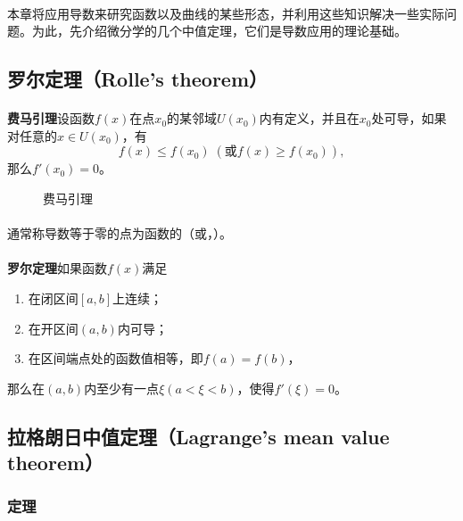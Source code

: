 \paragraph{}
本章将应用导数来研究函数以及曲线的某些形态，并利用这些知识解决一些实际问题。为此，先介绍微分学的几个中值定理，它们是导数应用的理论基础。

\subsection{罗尔定理（Rolle's theorem）}
\paragraph{}
\textbf{费马引理\;}设函数$f(x)$在点$x_0$的某邻域$U(x_0)$内有定义，并且在$x_0$处可导，如果对任意的$x\in U(x_0)$，有
\begin{equation}
  f(x) \leq f(x_0) \;(\text{或} f(x) \geq f(x_0)),
\end{equation}
那么$f'(x_0) = 0$。

\begin{figure}[H]
  \centering
    
    \label{Fermat‘s_theorem}
    \caption{费马引理}
\end{figure}

\paragraph{}
通常称导数等于零的点为函数的（或，）。

\paragraph{}
\textbf{罗尔定理\;}如果函数$f(x)$满足
\begin{enumerate}
  \item 在闭区间$[a,b]$上连续；
  \item 在开区间$(a,b)$内可导；
  \item 在区间端点处的函数值相等，即$f(a)=f(b)$，
\end{enumerate}
那么在$(a,b)$内至少有一点$\xi(a < \xi < b)$，使得$f'(\xi) = 0$。

\subsection{拉格朗日中值定理（Lagrange's mean value theorem）}
\subsubsection{定理}
